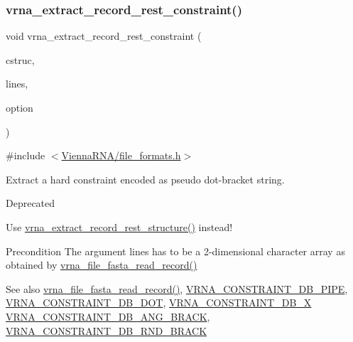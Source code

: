 \subsubsection{\texorpdfstring{vrna\+\_\+extract\+\_\+record\+\_\+rest\+\_\+constraint()}{vrna\_extract\_record\_rest\_constraint()}}
{\footnotesize\ttfamily void vrna\+\_\+extract\+\_\+record\+\_\+rest\+\_\+constraint (\begin{DoxyParamCaption}\item[{char $\ast$$\ast$}]{cstruc,  }\item[{const char $\ast$$\ast$}]{lines,  }\item[{unsigned int}]{option }\end{DoxyParamCaption})}



{\ttfamily \#include $<$\mbox{\hyperlink{file__formats_8h}{Vienna\+R\+N\+A/file\+\_\+formats.\+h}}$>$}



Extract a hard constraint encoded as pseudo dot-\/bracket string. 

\begin{DoxyRefDesc}{Deprecated}
\item[\mbox{\hyperlink{deprecated__deprecated000066}{Deprecated}}]Use \mbox{\hyperlink{group__file__utils_gad37cbb63a05eed63ba25c91628409be0}{vrna\+\_\+extract\+\_\+record\+\_\+rest\+\_\+structure()}} instead! \end{DoxyRefDesc}
\begin{DoxyPrecond}{Precondition}
The argument \textquotesingle{}lines\textquotesingle{} has to be a 2-\/dimensional character array as obtained by \mbox{\hyperlink{group__file__utils_ga8cfb7e271efc9e1f34640acb85475639}{vrna\+\_\+file\+\_\+fasta\+\_\+read\+\_\+record()}} 
\end{DoxyPrecond}
\begin{DoxySeeAlso}{See also}
\mbox{\hyperlink{group__file__utils_ga8cfb7e271efc9e1f34640acb85475639}{vrna\+\_\+file\+\_\+fasta\+\_\+read\+\_\+record()}}, \mbox{\hyperlink{group__hard__constraints_ga13053547a2de5532b64b64d35e097ae1}{V\+R\+N\+A\+\_\+\+C\+O\+N\+S\+T\+R\+A\+I\+N\+T\+\_\+\+D\+B\+\_\+\+P\+I\+PE}}, \mbox{\hyperlink{group__hard__constraints_ga369bea82eae75fbe626f409fa425747e}{V\+R\+N\+A\+\_\+\+C\+O\+N\+S\+T\+R\+A\+I\+N\+T\+\_\+\+D\+B\+\_\+\+D\+OT}}, \mbox{\hyperlink{group__hard__constraints_ga7283bbe0f8954f7b030ecc3f2d1932b2}{V\+R\+N\+A\+\_\+\+C\+O\+N\+S\+T\+R\+A\+I\+N\+T\+\_\+\+D\+B\+\_\+X}} \mbox{\hyperlink{constraints__hard_8h_ad54c1315a47d55653dcaa5de6e544b77}{V\+R\+N\+A\+\_\+\+C\+O\+N\+S\+T\+R\+A\+I\+N\+T\+\_\+\+D\+B\+\_\+\+A\+N\+G\+\_\+\+B\+R\+A\+CK}}, \mbox{\hyperlink{group__hard__constraints_gac17b034852c914bc5879954c65d7e74b}{V\+R\+N\+A\+\_\+\+C\+O\+N\+S\+T\+R\+A\+I\+N\+T\+\_\+\+D\+B\+\_\+\+R\+N\+D\+\_\+\+B\+R\+A\+CK}}
\end{DoxySeeAlso}

